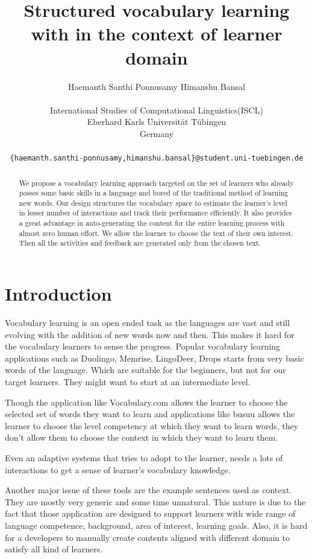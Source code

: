 \documentclass[11pt,a4paper]{article}
\title{Structured vocabulary learning with in the context of learner domain}
\author{Haemanth Santhi Ponnusamy \qquad Himanshu Bansal \\\\
  International Studies of Computational Linguistics(ISCL) \\
  Eberhard Karls Universität Tübingen\\
  Germany \\\\ \tt \small \{haemanth.santhi-ponnusamy,himanshu.bansal\}@student.uni-tuebingen.de}
\date{}
\begin{document}
\maketitle
\begin{abstract}
  We propose a vocabulary learning approach targeted on the set of learners
  who already posses some basic skills in a language and bored of the
  traditional method of learning new words. Our design 
  structures the vocabulary space to estimate the learner's
  level in lesser number of interactions and track their performance efficiently.
  It also provides a great advantage in auto-generating the content
  for the entire learning process with almost zero human effort. We allow the
  learner to choose the text of their own interest. Then all the activities and
  feedback are generated only from the chosen text.
\end{abstract}

\section{Introduction}
Vocabulary learning is an open ended task as the languages are vast and still
evolving with the addition of new words now and then. This makes it hard for the vocabulary learners to sense the progress. Popular vocabulary learning applications such as Duolingo, Memrise, LingoDeer, Drops starts from very basic words of the language. Which are suitable for the beginners, but not for our target learners. They might want to start at an intermediate level. 

Though the application like Vocabulary.com allows the learner to choose the selected set of words they want to learn and applications like busuu allows the learner to choose the level competency at which they want to learn words, 	they don't allow them to choose the context in which they want to learn them. 

Even an adaptive systems that tries to adopt to the learner, needs a lots of interactions
to get a sense of learner's vocabulary knowledge.

Another major issue of these tools are the
example sentences used as context. They are mostly very generic and some time unnatural.
This nature is due to the fact that those application are designed to support learners with wide range of
language competence, background, area of interest, learning goals. Also, it is
hard for a developers to manually create contents aligned with different domain to satisfy all kind of learners.
\end{document}

